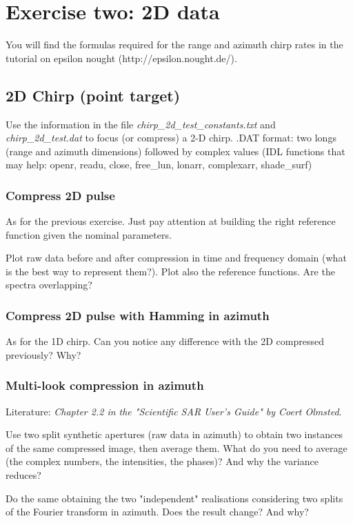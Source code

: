 \newpage
\section{Exercise two: 2D data}
You will find the formulas required for the range and azimuth chirp rates in the tutorial on epsilon nought (http://epsilon.nought.de/).

\subsection{2D Chirp (point target)}
Use the information in the file \textit{chirp\_2d\_test\_constants.txt} and \textit{chirp\_2d\_test.dat} to focus (or compress) a 2-D chirp.
.DAT format: two longs (range and azimuth dimensions) followed by complex values
(IDL functions that may help: openr, readu, close, free\_lun, lonarr, complexarr, shade\_surf)

\subsubsection{Compress 2D pulse}

As for the previous exercise. Just pay attention at building the right reference function given the nominal parameters.

Plot raw data before and after compression in time and frequency domain (what is the best way to represent them?). Plot also the reference functions. Are the spectra overlapping?

\subsubsection{Compress 2D pulse with Hamming in azimuth}

As for the 1D chirp. Can you notice any difference with the 2D compressed previously? Why?

\subsubsection{Multi-look compression in azimuth}
Literature: \textit{Chapter 2.2 in the "Scientific SAR User's Guide" by Coert Olmsted}.

Use two split synthetic apertures (raw data in azimuth) to obtain two instances of the same compressed image, then average them. What do you need to average (the complex numbers, the intensities, the phases)? And why the variance reduces? 

Do the same obtaining the two "independent" realisations considering two splits of the Fourier transform in azimuth. Does the result change? And why?


